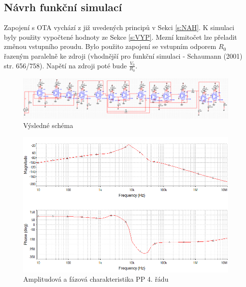 \subsection{Návrh funkční simulací}
\noindent  Zapojení s OTA vychází z již uvedených principů v Sekci \ref{s:NAH}. K simulaci byly použity vypočtené hodnoty ze Sekce \ref{s:VYP}. Mezní kmitočet lze přeladit změnou vstupního proudu.
\noindent Bylo použito zapojení se vstupním odporem $R_0$ řazeným paralelně ke zdroji (vhodnější pro funkční simulaci - Schaumann (2001) str. 656/758). Napětí na zdroji poté bude $\frac{V_0}{R_0}$.
\begin{figure}[h]
\centering
\includegraphics[scale=0.55]{maple.png}
\caption{Výsledné schéma}
\end{figure}
\begin{figure}[h]
\centering
\includegraphics[scale=0.6]{maple2.png}
\caption{Amplitudová a fázová charakteristika PP 4. řádu}
\end{figure}